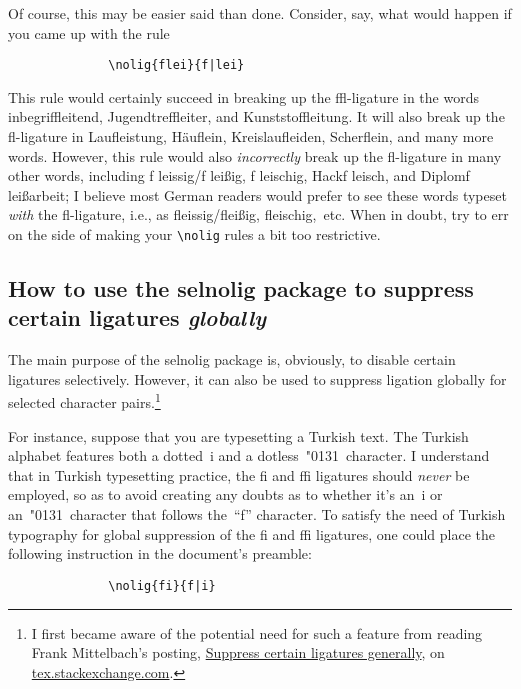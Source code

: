 \documentclass[11pt]{article}
\newcommand{\pkg}[1]{\textsf{#1}}
\newcommand{\cmmd}[1]{\texttt{\textbackslash #1}}
\begin{document}
Of course, this may be easier said than done. Consider, say, what would happen if you came up with the rule
\begin{Verbatim}
              \nolig{flei}{f|lei}
\end{Verbatim}
This rule would certainly succeed in breaking up the ffl-ligature in the words inbegriffleitend, Jugendtreffleiter, and Kunststoffleitung. It will also break up the fl-ligature in Laufleistung, Häuflein, Kreislaufleiden, Scherflein, and many more words. However, this rule would also \emph{incorrectly} break up the fl-ligature in many other words, including f\kern0pt leissig\slash f\kern0pt leißig, f\kern0pt leischig, Hackf\kern0pt leisch, and Diplomf\kern0pt leißarbeit; I believe most German readers would prefer to see these words typeset \emph{with} the fl-ligature, i.e., as fleissig\slash fleißig, fleischig,~etc. When in doubt, try to err on the side of making your \cmmd{nolig} rules a bit too restrictive.



\subsection[How to use the selnolig package to suppress certain ligatures globally]{How to use the \pkg{selnolig} package to suppress certain ligatures \emph{globally}}
\label{sec:global-nolig}


The main purpose of the \pkg{selnolig} package is, obviously, to disable certain ligatures selectively. However, it can also be used to suppress ligation globally for selected character pairs.\footnote{I first became aware of the potential need for such a feature from reading Frank Mittelbach's posting, \href{http://tex.stackexchange.com/q/61042/5001}{Suppress certain ligatures generally}, on \href{http://tex.stackexchange.com/}{tex.stackexchange.com}.} 

For instance, suppose that you are typesetting a Turkish text. The Turkish alphabet features both a dotted~i and a dotless~\char"0131\ character. I understand that in Turkish typesetting practice, the fi and ffi ligatures should \emph{never} be employed, so as to avoid creating any doubts as to whether it's an~i or an~\char"0131\ character that follows the~\enquote{f} character. To satisfy the need of Turkish typography for global suppression of the fi and ffi ligatures, one could place the following instruction in the document's preamble:
\begin{Verbatim}
              \nolig{fi}{f|i}
\end{Verbatim}
\end{document}
